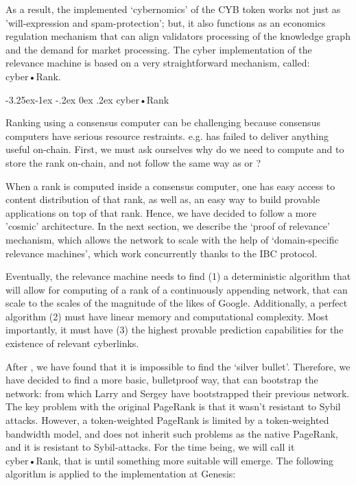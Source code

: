 \documentclass[8pt,oneside]{amsart}
\makeatletter
\newcommand{\linkred}[2]{\href{#1}{\color{red}{#2}}}
\newcommand{\linkgreen}[2]{\href{#1}{\color{green}{#2}}}
\renewcommand\subsection{\@startsection{subsection}{2}{\z@}%
                                     {-3.25ex\@plus -1ex \@minus -.2ex}%
                                     {0ex \@plus .2ex}%
                                     {\play\Large}}%
\newcommand{\titleSection}[1]{\subsection{#1}}
\newcommand{\code}[1]{{\PlayBold #1}}
\makeatother
\begin{document}
\begin{Abstract}
As a result, the implemented ‘cybernomics’ of the CYB token works not just as 'will-expression and spam-protection'; but, it also functions as an economics regulation mechanism that can align validators processing of the knowledge graph and the demand for market processing. The \code{cyber} implementation of the relevance machine is based on a very straightforward mechanism, called: cyber•Rank.

\titleSection{cyber•Rank}\label{cyberRank}

Ranking using a consensus computer can be challenging because consensus computers have serious resource restraints. e.g. \linkgreen{https://ipfs.io/ipfs/QmWTZjDZNbBqcJ5b6VhWGXBQ5EQavKKDteHsdoYqB5CBjh}{Nebulas} has failed to deliver anything useful on-chain. First, we must ask ourselves why do we need to compute and to store the rank on-chain, and not follow the same way as \linkgreen{https://ipfs.io/ipfs/QmZo7eY5UdJYotf3Z9GNVBGLjkCnE1j2fMdW2PgGCmvGPj}{Colony} or \linkgreen{https://ipfs.io/ipfs/QmTrxXp2xhB2zWGxhNoLgsztevqKLwpy5HwKjLjzFa7rnD}{Truebit}?

When a rank is computed inside a consensus computer, one has easy access to content distribution of that rank, as well as, an easy way to build provable applications on top of that rank. Hence, we have decided to follow a more 'cosmic' architecture. In the next section, we describe the ‘proof of relevance’ mechanism, which allows the network to scale with the help of ‘domain-specific relevance machines’, which work concurrently thanks to the IBC protocol.

Eventually, the relevance machine needs to find (1) a deterministic algorithm that will allow for computing of a rank of a continuously appending network, that can scale to the scales of the magnitude of the likes of Google. Additionally, a perfect algorithm (2) must have linear memory and computational complexity. Most importantly, it must have (3) the highest provable prediction capabilities for the existence of relevant cyberlinks.

After \linkred{https://arxiv.org/pdf/1709.09002.pdf}{some research}, we have found that it is impossible to find the ‘silver bullet’. Therefore, we have decided to find a more basic, bulletproof way, that can bootstrap the network: \linkred{http://ilpubs.stanford.edu:8090/422/1/1999-66.pdf}{the rank} from which Larry and Sergey have bootstrapped their previous network. The key problem with the original PageRank is that it wasn't resistant to Sybil attacks. However, a token-weighted PageRank is limited by a token-weighted bandwidth model, and does not inherit such problems as the native PageRank, and it is resistant to Sybil-attacks. For the time being, we will call it cyber•Rank, that is until something more suitable will emerge. The following algorithm is applied to the implementation at Genesis:


\end{Abstract}
\end{document}
